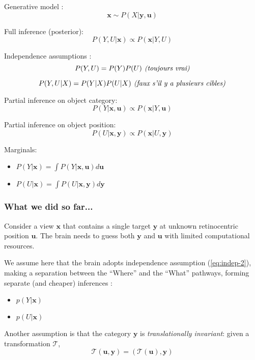 Generative model :
$$ \boldsymbol{x} \sim P(X|\boldsymbol{y}, \boldsymbol{u}) $$

Full inference (posterior):
$$ P(Y, U|\boldsymbol{x}) \propto  P(\boldsymbol{x}|Y, U) $$

Independence assumptions :
\begin{equation} 
P(Y, U) = P(Y)  P(U) \text{\emph{ (toujours vrai)}}
\label{eq:indep-1}
\end{equation}

\begin{equation}  
P(Y, U|X) = P(Y|X)  P(U|X) \text{\emph{ (faux s'il y a plusieurs cibles)}}
\label{eq:indep-2}
\end{equation}

Partial inference on object category:
$$ P(Y|\boldsymbol{x}, \boldsymbol{u}) \propto  P(\boldsymbol{x}|Y, \boldsymbol{u}) $$

Partial inference on object position:
$$ P(U|\boldsymbol{x}, \boldsymbol{y}) \propto  P(\boldsymbol{x}|U, \boldsymbol{y}) $$

Marginals:
\begin{itemize}
\item $ P(Y|\boldsymbol{x}) = \int P(Y|\boldsymbol{x}, \boldsymbol{u}) d\boldsymbol{u}$
\item $ P(U|\boldsymbol{x}) = \int P(U|\boldsymbol{x}, \boldsymbol{y}) d\boldsymbol{y}$
\end{itemize}

\subsubsection{What we did so far...}

Consider a view $\boldsymbol{x}$ that contains a single target $\boldsymbol{y}$ at unknown retinocentric position $\boldsymbol{u}$. The brain needs to guess both  $\boldsymbol{y}$ and $\boldsymbol{u}$ with limited computational resources. 
   
We assume here that the brain adopts independence assumption (\ref{eq:indep-2}), making a separation between the ``Where'' and the ``What'' pathways, forming separate (and cheaper) inferences :
\begin{itemize}
\item $p(Y|\boldsymbol{x})$
\item $p(U|\boldsymbol{x})$
\end{itemize}

Another assumption is that the category $\boldsymbol{y}$ is \emph{translationally invariant}: given a transformation $\mathcal{T}$,
$$\mathcal{T}(\boldsymbol{u}, \boldsymbol{y}) 
= (\mathcal{T}(\boldsymbol{u}), \boldsymbol{y})$$

